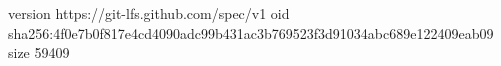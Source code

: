 version https://git-lfs.github.com/spec/v1
oid sha256:4f0e7b0f817e4cd4090adc99b431ac3b769523f3d91034abc689e122409eab09
size 59409
